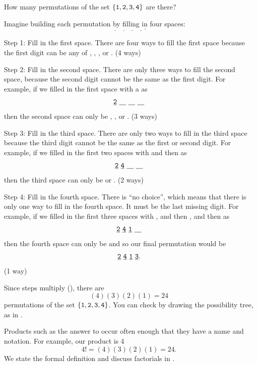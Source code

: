 \begin{exam} 
\label{exam_perms_1to4}
    How many permutations of the set 
        $\{\texttt{1},\texttt{2},\texttt{3},\texttt{4}\}$ 
    are there?  
    \begin{soln}
        Imagine building each permutation by filling in four spaces: $$\underline{\quad}~\underline{\quad}~\underline{\quad}~\underline{\quad}.$$
        
        Step 1: Fill in the first space.  There are four ways to fill the first space because the first digit can be any of , , , or . (4 ways)

        Step 2: Fill in the second space.  There are only three ways to fill the second space, because the second digit cannot be the same as the first digit.  For example, if we filled in the first space with a  as             $$\underline{\texttt{2}}~\underline{\quad}~\underline{\quad}~\underline{\quad}$$
        then the second space can only be , , or . (3 ways)

        Step 3: Fill in the third space.  There are only two ways to fill in the third space because the third digit cannot be the same as the first or second digit.  For example, if we filled in the first two spaces with  and then  as       $$\underline{\texttt{2}}~\underline{\texttt{4}}~\underline{\quad}~\underline{\quad}$$
        then the third space can only be  or . (2 ways)

        Step 4: Fill in the fourth space.  There is ``no choice'', which means that there is only one way to fill in the fourth space.  It must be the last missing digit.  For example, if we filled in the first three spaces with , and then , and then  as      $$\underline{\texttt{2}}~\underline{\texttt{4}}~\underline{\texttt{1}}~\underline{\quad}$$
        then the fourth space can only be  and so our final permutation would be        $$\underline{\texttt{2}}~\underline{\texttt{4}}~\underline{\texttt{1}}~\underline{\texttt{3}}.$$ (1 way)

        Since steps multiply (), there are $$(4)(3)(2)(1) = 24$$
        permutations of the set 
        $\{\texttt{1},\texttt{2},\texttt{3},\texttt{4}\}$.  You can check by drawing the possibility tree, as in  .
    \end{soln}
\end{exam}

Products such as the answer to  occur often enough that they have a name and notation.  For example, our product is 4  $$4! = (4)(3)(2)(1) = 24.$$  We state the formal definition and discuss factorials in .

